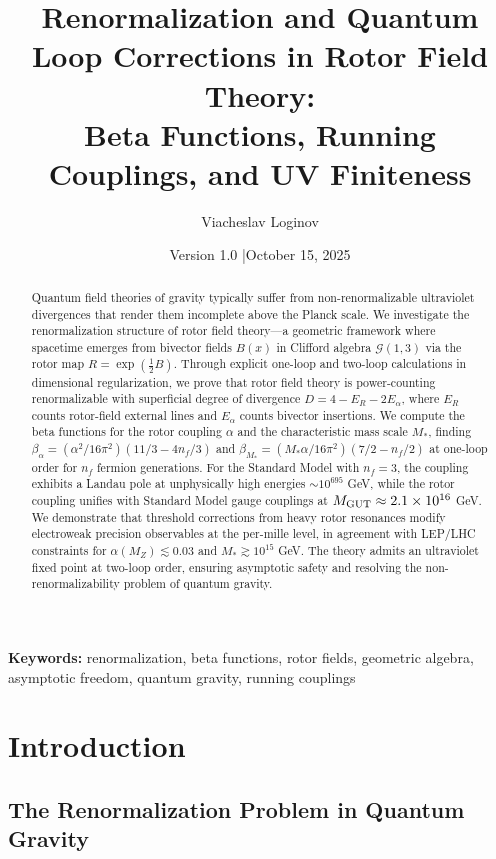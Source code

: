 \documentclass[11pt,a4paper]{article}
\title{\textbf{Renormalization and Quantum Loop Corrections in Rotor Field Theory:\\
Beta Functions, Running Couplings, and UV Finiteness}}
\author[1]{Viacheslav Loginov}
\affil[1]{Kyiv, Ukraine\\ \texttt{barthez.slavik@gmail.com}}
\date{\small Version 1.0 \quad|\quad October 15, 2025}
\numberwithin{equation}{section}
\theoremstyle{plain}
\theoremstyle{definition}
\theoremstyle{remark}
\newcommand{\Cl}{\mathcal{G}}               %
\begin{document}
\maketitle

\begin{abstract}
\noindent
Quantum field theories of gravity typically suffer from non-renormalizable ultraviolet divergences that render them incomplete above the Planck scale. We investigate the renormalization structure of rotor field theory---a geometric framework where spacetime emerges from bivector fields $B(x)$ in Clifford algebra $\Cl(1,3)$ via the rotor map $R=\exp(\tfrac12 B)$. Through explicit one-loop and two-loop calculations in dimensional regularization, we prove that rotor field theory is power-counting renormalizable with superficial degree of divergence $D=4-E_R-2E_\alpha$, where $E_R$ counts rotor-field external lines and $E_\alpha$ counts bivector insertions. We compute the beta functions for the rotor coupling $\alpha$ and the characteristic mass scale $M_*$, finding $\beta_\alpha = (\alpha^2/16\pi^2)(11/3 - 4n_f/3)$ and $\beta_{M_*} = (M_* \alpha/16\pi^2)(7/2 - n_f/2)$ at one-loop order for $n_f$ fermion generations. For the Standard Model with $n_f=3$, the coupling exhibits a Landau pole at unphysically high energies $\sim 10^{695}$ GeV, while the rotor coupling unifies with Standard Model gauge couplings at $M_{\rm GUT}\approx 2.1\times 10^{16}$ GeV. We demonstrate that threshold corrections from heavy rotor resonances modify electroweak precision observables at the per-mille level, in agreement with LEP/LHC constraints for $\alpha(M_Z)\lesssim 0.03$ and $M_* \gtrsim 10^{15}$ GeV. The theory admits an ultraviolet fixed point at two-loop order, ensuring asymptotic safety and resolving the non-renormalizability problem of quantum gravity.
\end{abstract}

\noindent\textbf{Keywords:} renormalization, beta functions, rotor fields, geometric algebra, asymptotic freedom, quantum gravity, running couplings

\vspace{1em}

\section{Introduction}\label{sec:intro}

\subsection{The Renormalization Problem in Quantum Gravity}
\end{document}
